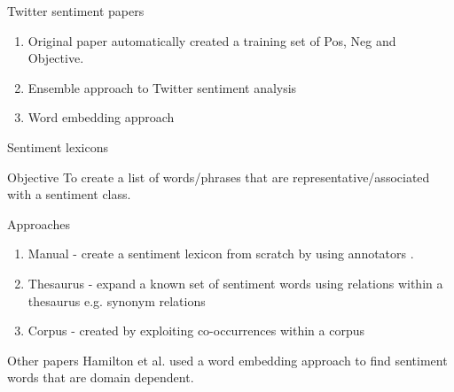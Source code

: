 \documentclass[10pt]{beamer}
\begin{document}
\begin{frame}{Twitter sentiment papers}
  \begin{enumerate}
    \item Original paper \cite{Pak10} automatically created a training set of Pos, Neg and Objective.
    \item Ensemble approach to Twitter sentiment analysis \cite{Hagen15}
    \item Word embedding approach \cite{Tang14}
  \end{enumerate}

\end{frame}

\begin{frame}{Sentiment lexicons}
  \begin{block}{Objective}
  To create a list of words/phrases that are representative/associated with a sentiment class.
  \end{block}
  \begin{block}{Approaches}
    \begin{enumerate}
      \item Manual - create a sentiment lexicon from scratch by using annotators \cite{Loughran11}.
      \item Thesaurus - expand a known set of sentiment words using relations within a thesaurus e.g. synonym relations \cite{Hu04}
      \item Corpus - created by exploiting co-occurrences within a corpus \cite{Kaji07}
    \end{enumerate}
  \end{block}
  \begin{block}{Other papers}
  Hamilton et al. \cite{Hamilton16} used a word embedding approach to find sentiment words that are domain dependent.
  
  \end{block}

\end{frame}
\end{document}
